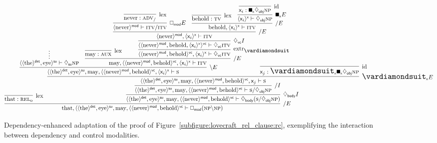 \begin{figure}
	\smaller[2]
	\[
		\infer[\divright E]{\w{that}, \dbra{\dbra{\w{the}}{det}, \w{eye}}{su}, \w{may}, \dbra{\dbra{\w{never}}{mod}, \w{behold}}{vc} \vdash \dbox{mod}(\np\divleft\np)}{
			\infer[\Lex]{\w{that} :  \subcat{l}{rel}{o}}{}
			&
			\hspace{-50pt}
			\infer[\ddia{body}I]{\dbra{\dbra{\w{the}}{det}, \w{eye}}{su}, \w{may}, \dbra{\dbra{\w{never}}{mod}, \w{behold}}{vc} \vdash \ddia{body}(\s\divright\ddia{obj}\np)}{
				\infer[\divright I]{\dbra{\dbra{\w{the}}{det}, \w{eye}}{su}, \w{may}, \dbra{\dbra{\w{never}}{mod}, \w{behold}}{vc} \vdash \s\divright\ddia{obj}\np}{
					\infer[\dxdia{x}E]{\dbra{\dbra{\w{the}}{det}, \w{eye}}{su}, \w{may}, \dbra{\dbra{\w{never}}{mod}, \w{behold}}{vc}, \varj \vdash \s}{
						\infer[\divleft E]{\dbra{\dbra{\w{the}}{det}, \w{eye}}{su}, \w{may}, \dbra{\dbra{\w{never}}{mod}, \w{behold}}{vc}, \dbra{\vari}{x} \vdash \s}{
							\infer*{\dbra{\dbra{\w{the}}{det}, \w{eye}}{su} \vdash \ddia{su}\np}{	}
							&
							\infer[\divright E]{\w{may}, \dbra{\dbra{\w{never}}{mod}, \w{behold}}{vc}, \dbra{\vari}{x} \vdash \gtype{itv}}{
								\infer[\Lex]{\w{may} : \gtype{aux}}{}
								&
								\hspace{-25pt}\infer[\Extraction]{\dbra{\dbra{\w{never}}{mod}, \w{behold}}{vc}, \dbra{\vari}{x} \vdash \ddia{vc}\gtype{itv}}{
									\infer[\ddia{vc}I]{\dbra{\dbra{\w{never}}{mod}, \w{behold}, \dbra{\vari}{x}}{vc} \vdash \ddia{vc}\gtype{itv}}{
										\infer[\divright E]{\dbra{\w{never}}{mod}, \dbra{\vari}{x} \vdash \gtype{itv}}{
											\infer[\dbox{mod}E]{\dbra{\w{never}}{mod} \vdash \gtype{itv}\divright\gtype{itv}}{
												\infer[\Lex]{\w{never} : \gtype[l]{adv}_{\divright}}{}
											}
											&
											\infer[\divright E]{\w{behold}, \dbra{\vari}{x} \vdash \gtype{itv}}{
												\infer[\Lex]{\w{behold}: \gtype[l]{tv}}{}
												&
												\infer[\dxbox{x} E]{\dbra{\vari}{x} \vdash \ddia{obj} \np}{
													\infer[\Ax]{\vari : \dxbox{x}\ddia{obj}\np}{}
												}
											}
										}
									}
								}
							}
						}
						&
						\hspace{-60pt}
						\infer[\Ax]{\varj : \dxdia{x}\dxbox{x}\ddia{obj}\np}{}
					}
				}
			}
		}
	\]
	\caption{Dependency-enhanced adaptation of the proof of Figure~\ref{subfigure:lovecraft_rel_clause:rc}, exemplifying the interaction between dependency and control modalities.}
	\label{figure:lovecraft_dep_rep_clause}
\end{figure}


